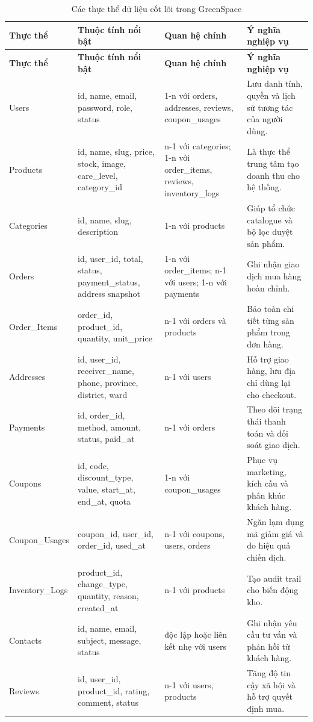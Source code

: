\documentclass[11pt, a4paper]{article}
\begin{document}
\begingroup
\small
\setlength{\LTpre}{0pt}
\setlength{\LTpost}{0pt}
\begin{longtable}{|p{3cm}|p{4.4cm}|p{3.4cm}|p{4.1cm}|}
    \caption{Các thực thể dữ liệu cốt lõi trong GreenSpace}
    \label{tab:data-entities} \\
    \hline
    \textbf{Thực thể} & \textbf{Thuộc tính nổi bật} & \textbf{Quan hệ chính} & \textbf{Ý nghĩa nghiệp vụ} \\ \hline
    \endfirsthead
    \hline
    \textbf{Thực thể} & \textbf{Thuộc tính nổi bật} & \textbf{Quan hệ chính} & \textbf{Ý nghĩa nghiệp vụ} \\ \hline
    \endhead
    Users & id, name, email, password, role, status & 1-n với orders, addresses, reviews, coupon\_usages & Lưu danh tính, quyền và lịch sử tương tác của người dùng. \\ \hline
    Products & id, name, slug, price, stock, image, care\_level, category\_id & n-1 với categories; 1-n với order\_items, reviews, inventory\_logs & Là thực thể trung tâm tạo doanh thu cho hệ thống. \\ \hline
    Categories & id, name, slug, description & 1-n với products & Giúp tổ chức catalogue và bộ lọc duyệt sản phẩm. \\ \hline
    Orders & id, user\_id, total, status, payment\_status, address snapshot & 1-n với order\_items; n-1 với users; 1-n với payments & Ghi nhận giao dịch mua hàng hoàn chỉnh. \\ \hline
    Order\_Items & order\_id, product\_id, quantity, unit\_price & n-1 với orders và products & Bảo toàn chi tiết từng sản phẩm trong đơn hàng. \\ \hline
    Addresses & id, user\_id, receiver\_name, phone, province, district, ward & n-1 với users & Hỗ trợ giao hàng, lưu địa chỉ dùng lại cho checkout. \\ \hline
    Payments & id, order\_id, method, amount, status, paid\_at & n-1 với orders & Theo dõi trạng thái thanh toán và đối soát giao dịch. \\ \hline
    Coupons & id, code, discount\_type, value, start\_at, end\_at, quota & 1-n với coupon\_usages & Phục vụ marketing, kích cầu và phân khúc khách hàng. \\ \hline
    Coupon\_Usages & coupon\_id, user\_id, order\_id, used\_at & n-1 với coupons, users, orders & Ngăn lạm dụng mã giảm giá và đo hiệu quả chiến dịch. \\ \hline
    Inventory\_Logs & product\_id, change\_type, quantity, reason, created\_at & n-1 với products & Tạo audit trail cho biến động kho. \\ \hline
    Contacts & id, name, email, subject, message, status & độc lập hoặc liên kết nhẹ với users & Ghi nhận yêu cầu tư vấn và phản hồi từ khách hàng. \\ \hline
    Reviews & id, user\_id, product\_id, rating, comment, status & n-1 với users, products & Tăng độ tin cậy xã hội và hỗ trợ quyết định mua. \\ \hline
\end{longtable}
\endgroup
\end{document}
